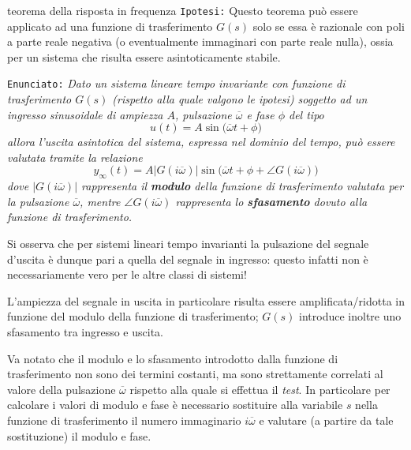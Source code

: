 		\begin{teorema}{ teorema della risposta in frequenza \label{teor:rispostafrequenza} }
				\texttt{Ipotesi:} Questo teorema può essere applicato ad una funzione di trasferimento $G(s)$ solo se essa è razionale con poli a parte reale negativa (o eventualmente immaginari con parte reale nulla), ossia per un sistema che risulta essere asintoticamente stabile. 
				
				\vspace{3mm}
				
				\texttt{Enunciato:} {\itshape Dato un sistema lineare tempo invariante con funzione di trasferimento $G(s)$ (rispetto alla quale valgono le ipotesi) soggetto ad un ingresso sinusoidale di ampiezza $A$, pulsazione $\overline \omega$ e fase $\phi$ del tipo
				\[  u(t) = A \sin\big(\overline \omega t + \phi\big)\]
				allora l'uscita asintotica del sistema, espressa nel dominio del tempo, può essere valutata tramite la relazione
				\begin{equation}
					y_\infty(t) = A \big|G(i\overline \omega)\big| \sin \big(\overline \omega t + \phi + \angle G(i\overline \omega)\big)
				\end{equation}
				dove $\big|G(i\overline \omega)\big|$ rappresenta il \textbf{modulo} della funzione di trasferimento valutata per la pulsazione $\overline \omega$, mentre $ \angle G(i\overline \omega)$ rappresenta lo \textbf{sfasamento} dovuto alla funzione di trasferimento. 			}
		\end{teorema} 
		\begin{osservazione}
			Si osserva che per sistemi lineari tempo invarianti la pulsazione del segnale d'uscita è dunque pari a quella del segnale in ingresso: questo infatti non è necessariamente vero per le altre classi di sistemi!
			
			L'ampiezza del segnale in uscita in particolare risulta essere amplificata/ridotta in funzione del modulo della funzione di trasferimento; $G(s)$ introduce inoltre uno sfasamento tra ingresso e uscita.
		\end{osservazione}
		Va notato che il modulo e lo sfasamento introdotto dalla funzione di trasferimento non sono dei termini costanti, ma sono strettamente correlati al valore della pulsazione $\overline \omega$ rispetto alla quale si effettua il \textit{test}. In particolare per calcolare i valori di modulo e fase è necessario sostituire alla variabile $s$ nella funzione di trasferimento il numero immaginario $i\overline \omega$ e valutare (a partire da tale sostituzione) il modulo e fase.
		
